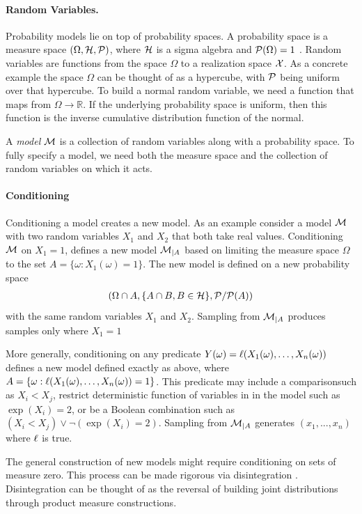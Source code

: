 \paragraph{Random Variables.} Probability models lie on top of probability
spaces. A probability space is a measure space $(\Omega, {\cal H}, {\cal P})$,
where ${\cal H}$ is a sigma algebra and ${\cal P}(\Omega) = 1$ \citep{ccinlar2011probability}. Random variables are
functions from the space $\Omega$ to a realization space ${\cal X}$. As a concrete
example the space $\Omega$ can be thought of as a hypercube, with ${\cal P}$ being
uniform over that hypercube. To build a normal random variable, we need a function
that maps from $\Omega \to \mathbb{R}$. If the underlying probability space is uniform, then
this function is the inverse cumulative distribution function of the normal.

A \emph{model} ${\cal M}$ is a collection of random variables along with a probability space.
To fully specify a model, we need both the measure space and the
collection of random variables on which it acts.

\paragraph{Conditioning}

Conditioning a model creates a new model.
As an example consider a model ${\cal M}$ with two
random variables $X_1$ and $X_2$ that both take real values. Conditioning
${\cal M}$ on $X_1 = 1$, defines a new model ${\cal M}_{|A}$ based on limiting the measure space
$\Omega$ to the set $A = \{ \omega : X_1(\omega) = 1\}$.
The new model is defined on a new probability space
\begin{align}
	(\Omega \cap A, \{A \cap B, B \in {\cal H} \}, {\cal P} / {\cal P}(A))
\end{align}
with the same random variables $X_1$ and $X_2$.
Sampling from ${\cal M}_{|A}$ produces
samples only where $X_1 = 1$

More generally, conditioning on any predicate $Y(\omega) = \operatorname{\ell}(X_1(\omega), \dots, X_n(\omega))$
defines a new model defined exactly as above, where $A = \{\omega : \operatorname{\ell}(X_1(\omega), \dots, X_n(\omega)) = 1\}$.
This predicate may include a comparisonsuch as $X_i < X_j$, restrict deterministic function of variables in in the model such as $\exp(X_i) = 2$, or be a Boolean combination such as $(X_i < X_j) \lor \neg(\exp(X_i) = 2)$.
Sampling from ${\cal M}_{|A}$ generates $(x_1, ..., x_n)$ where $\operatorname{\ell}$ is true.

The general construction of new models might require conditioning
on sets of measure zero. This process can be made rigorous
via disintegration \citep{chang1997conditioning}. Disintegration can
be thought of as the reversal of building joint distributions through
product measure constructions.


